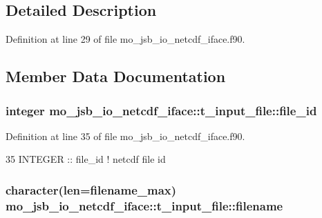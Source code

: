\subsection{Detailed Description}


Definition at line 29 of file mo\+\_\+jsb\+\_\+io\+\_\+netcdf\+\_\+iface.\+f90.



\subsection{Member Data Documentation}
\hypertarget{structmo__jsb__io__netcdf__iface_1_1t__input__file_a3a9193443bbe298db86800c22fee0093}{}
\subsubsection[{file\+\_\+id}]{\setlength{\rightskip}{0pt plus 5cm}integer mo\+\_\+jsb\+\_\+io\+\_\+netcdf\+\_\+iface\+::t\+\_\+input\+\_\+file\+::file\+\_\+id}\label{structmo__jsb__io__netcdf__iface_1_1t__input__file_a3a9193443bbe298db86800c22fee0093}


Definition at line 35 of file mo\+\_\+jsb\+\_\+io\+\_\+netcdf\+\_\+iface.\+f90.


\begin{DoxyCode}
35     \textcolor{keywordtype}{INTEGER} :: file\_id          \textcolor{comment}{! netcdf file id}
\end{DoxyCode}
\hypertarget{structmo__jsb__io__netcdf__iface_1_1t__input__file_ac84b2e6357fa46896db41369d0d86969}{}
\subsubsection[{filename}]{\setlength{\rightskip}{0pt plus 5cm}character(len=filename\+\_\+max) mo\+\_\+jsb\+\_\+io\+\_\+netcdf\+\_\+iface\+::t\+\_\+input\+\_\+file\+::filename}\label{structmo__jsb__io__netcdf__iface_1_1t__input__file_ac84b2e6357fa46896db41369d0d86969}


